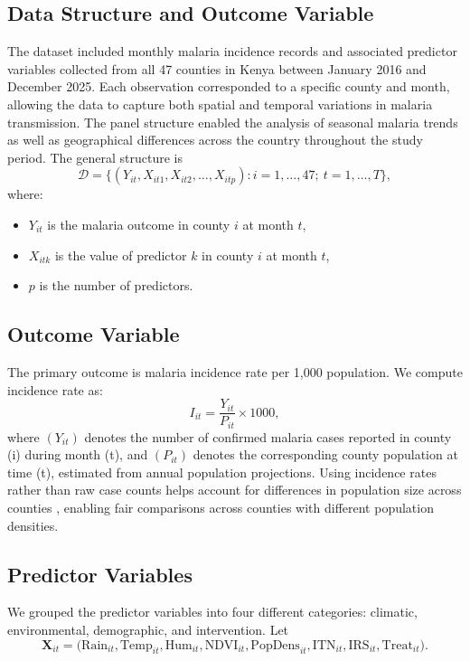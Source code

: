 \subsection{Data Structure and Outcome Variable}
The dataset included monthly malaria incidence records and associated predictor variables collected from all 47 counties in Kenya between January 2016 and December 2025. Each observation  corresponded to a specific county and month, allowing the data to capture both spatial and temporal variations in malaria transmission. The panel structure enabled the analysis of seasonal malaria trends as well as geographical differences across the country throughout the study period. The general structure is
\[
\mathcal{D} = \{(Y_{it}, X_{it1}, X_{it2}, \dots, X_{itp}) : i = 1, \dots, 47; \ t = 1, \dots, T\},
\]
where:
\begin{itemize} 
	\item \( Y_{it} \) is the malaria outcome in county \( i \) at month \( t \),
	\item \( X_{itk} \) is the value of predictor \( k \) in county \( i \) at month \( t \),
	\item \( p \) is the number of predictors.
\end{itemize}

\subsection{Outcome Variable}
The primary outcome is malaria incidence rate per 1,000 population. We compute incidence rate as:
\[
I_{it} = \frac{Y_{it}}{P_{it}} \times 1000,
\]
where $(Y_{it})$ denotes the number of confirmed malaria cases reported in county (i) during month (t), and $(P_{it})$ denotes the corresponding county population at time (t), estimated from annual population projections. Using incidence rates rather than raw case counts helps account for differences in population size across counties \cite{WHO_malaria_2024}, enabling fair comparisons across counties with different population densities.

\subsection{Predictor Variables}
\label{sec:predictor_variables}
We grouped the predictor variables into four different categories: climatic, environmental, demographic, and intervention. Let
\[
\mathbf{X}_{it} = \bigl( \text{Rain}_{it}, \text{Temp}_{it}, \text{Hum}_{it}, \text{NDVI}_{it}, \text{PopDens}_{it}, \text{ITN}_{it}, \text{IRS}_{it}, \text{Treat}_{it} \bigr).
\]


